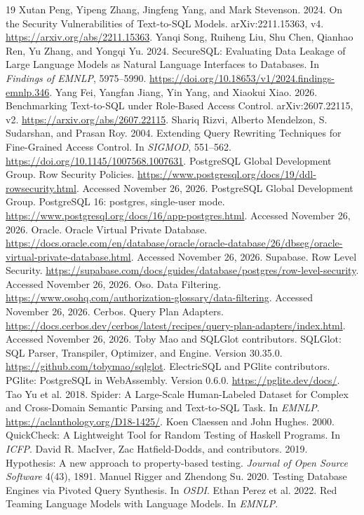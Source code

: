\documentclass[sigconf,nonacm,natbib=false]{acmart}
\begin{document}
\begin{thebibliography}{19}
 Xutan Peng, Yipeng Zhang, Jingfeng Yang, and Mark Stevenson. 2024.
On the Security Vulnerabilities of Text-to-SQL Models. arXiv:2211.15363, v4. \url{https://arxiv.org/abs/2211.15363}.
 Yanqi Song, Ruiheng Liu, Shu Chen, Qianhao Ren, Yu Zhang, and Yongqi Yu. 2024.
SecureSQL: Evaluating Data Leakage of Large Language Models as Natural Language Interfaces to Databases.
In \emph{Findings of EMNLP}, 5975--5990. \url{https://doi.org/10.18653/v1/2024.findings-emnlp.346}.
 Yang Fei, Yangfan Jiang, Yin Yang, and Xiaokui Xiao. 2026.
Benchmarking Text-to-SQL under Role-Based Access Control. arXiv:2607.22115, v2. \url{https://arxiv.org/abs/2607.22115}.
 Shariq Rizvi, Alberto Mendelzon, S. Sudarshan, and Prasan Roy. 2004.
Extending Query Rewriting Techniques for Fine-Grained Access Control. In \emph{SIGMOD}, 551--562.
\url{https://doi.org/10.1145/1007568.1007631}.
 PostgreSQL Global Development Group. Row Security Policies.
\url{https://www.postgresql.org/docs/19/ddl-rowsecurity.html}. Accessed November 26, 2026.
 PostgreSQL Global Development Group. PostgreSQL 16: postgres, single-user mode.
\url{https://www.postgresql.org/docs/16/app-postgres.html}. Accessed November 26, 2026.
 Oracle. Oracle Virtual Private Database.
\url{https://docs.oracle.com/en/database/oracle/oracle-database/26/dbseg/oracle-virtual-private-database.html}. Accessed November 26, 2026.
 Supabase. Row Level Security.
\url{https://supabase.com/docs/guides/database/postgres/row-level-security}. Accessed November 26, 2026.
 Oso. Data Filtering.
\url{https://www.osohq.com/authorization-glossary/data-filtering}. Accessed November 26, 2026.
 Cerbos. Query Plan Adapters.
\url{https://docs.cerbos.dev/cerbos/latest/recipes/query-plan-adapters/index.html}. Accessed November 26, 2026.
 Toby Mao and SQLGlot contributors. SQLGlot: SQL Parser, Transpiler, Optimizer, and Engine. Version 30.35.0.
\url{https://github.com/tobymao/sqlglot}.
 ElectricSQL and PGlite contributors. PGlite: PostgreSQL in WebAssembly. Version 0.6.0.
\url{https://pglite.dev/docs/}.
 Tao Yu et al. 2018. Spider: A Large-Scale Human-Labeled Dataset for Complex and Cross-Domain Semantic Parsing and Text-to-SQL Task.
In \emph{EMNLP}. \url{https://aclanthology.org/D18-1425/}.
 Koen Claessen and John Hughes. 2000. QuickCheck: A Lightweight Tool for Random Testing of Haskell Programs. In \emph{ICFP}.
 David R. MacIver, Zac Hatfield-Dodds, and contributors. 2019. Hypothesis: A new approach to property-based testing. \emph{Journal of Open Source Software} 4(43), 1891.
 Manuel Rigger and Zhendong Su. 2020. Testing Database Engines via Pivoted Query Synthesis. In \emph{OSDI}.
 Ethan Perez et al. 2022. Red Teaming Language Models with Language Models. In \emph{EMNLP}.
\end{thebibliography}
\end{document}
